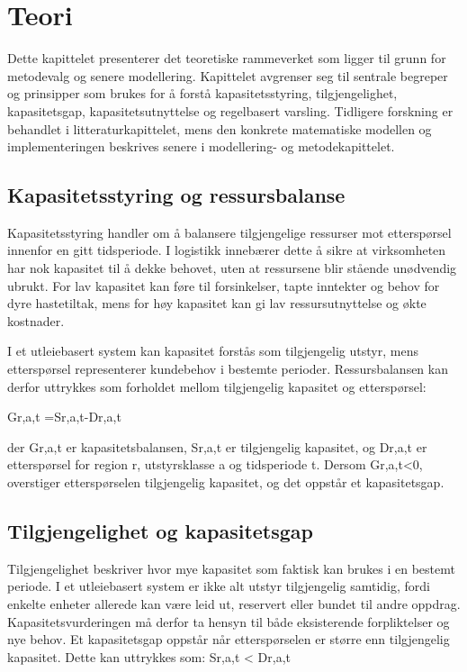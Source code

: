 \documentclass[a4paper,11pt]{article}
\begin{document}
\section{Teori}

Dette kapittelet presenterer det teoretiske rammeverket som ligger til grunn for metodevalg og senere modellering. Kapittelet avgrenser seg til sentrale begreper og prinsipper som brukes for å forstå kapasitetsstyring, tilgjengelighet, kapasitetsgap, kapasitetsutnyttelse og regelbasert varsling. Tidligere forskning er behandlet i litteraturkapittelet, mens den konkrete matematiske modellen og implementeringen beskrives senere i modellering- og metodekapittelet.

\subsection{Kapasitetsstyring og ressursbalanse}

Kapasitetsstyring handler om å balansere tilgjengelige ressurser mot etterspørsel innenfor en gitt tidsperiode. I logistikk innebærer dette å sikre at virksomheten har nok kapasitet til å dekke behovet, uten at ressursene blir stående unødvendig ubrukt. For lav kapasitet kan føre til forsinkelser, tapte inntekter og behov for dyre hastetiltak, mens for høy kapasitet kan gi lav ressursutnyttelse og økte kostnader.

I et utleiebasert system kan kapasitet forstås som tilgjengelig utstyr, mens etterspørsel representerer kundebehov i bestemte perioder. Ressursbalansen kan derfor uttrykkes som forholdet mellom tilgjengelig kapasitet og etterspørsel:

Gr,a,t =Sr,a,t-Dr,a,t

der Gr,a,t er kapasitetsbalansen, Sr,a,t er tilgjengelig kapasitet, og Dr,a,t er etterspørsel for region r, utstyrsklasse a og tidsperiode t. Dersom Gr,a,t<0, overstiger etterspørselen tilgjengelig kapasitet, og det oppstår et kapasitetsgap.

\subsection{Tilgjengelighet og kapasitetsgap}

Tilgjengelighet beskriver hvor mye kapasitet som faktisk kan brukes i en bestemt periode. I et utleiebasert system er ikke alt utstyr tilgjengelig samtidig, fordi enkelte enheter allerede kan være leid ut, reservert eller bundet til andre oppdrag. Kapasitetsvurderingen må derfor ta hensyn til både eksisterende forpliktelser og nye behov.   Et kapasitetsgap oppstår når etterspørselen er større enn tilgjengelig kapasitet. Dette kan uttrykkes som:   Sr,a,t < Dr,a,t
\end{document}
